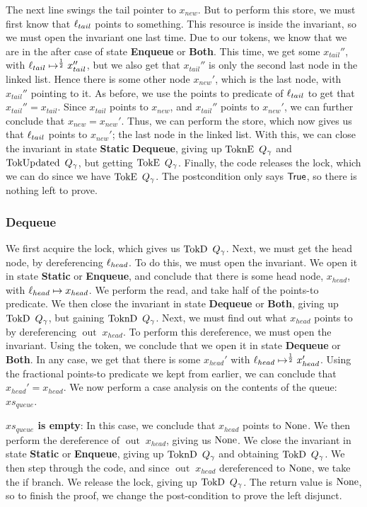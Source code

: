 \documentclass[twoside,11pt,openright]{report}
\newcommand{\nOut}[1]{\operatorname{out} \; #1}
\newcommand{\StaticState}{\textbf{Static}}
\newcommand{\EnqueueState}{\textbf{Enqueue}}
\newcommand{\DequeueState}{\textbf{Dequeue}}
\newcommand{\BothState}{\textbf{Both}}
\newcommand{\Qg}{Q_\gname}
\newcommand{\TokE}[1]{\operatorname{TokE}\ #1}
\newcommand{\TokEQg}{\TokE{\Qg}}
\newcommand{\ToknE}[1]{\operatorname{ToknE}\ #1}
\newcommand{\ToknEQg}{\ToknE{\Qg}}
\newcommand{\TokD}[1]{\operatorname{TokD}\ #1}
\newcommand{\TokDQg}{\TokD{\Qg}}
\newcommand{\ToknD}[1]{\operatorname{ToknD}\ #1}
\newcommand{\ToknDQg}{\ToknD{\Qg}}
\newcommand{\TokUpdated}[1]{\operatorname{TokUpdated}\ #1}
\newcommand{\TokUpdatedQg}{\TokUpdated{\Qg}}
\begin{document}
The next line swings the tail pointer to $x_{new}$. But to perform this store, we must first know that $\ell_{tail}$ points to something. This resource is inside the invariant, so we must open the invariant one last time. Due to our tokens, we know that we are in the after case of state \EnqueueState{} or \BothState{}. This time, we get some $x_{tail}''$, with $\ell_{tail} \mapsto^{\frac{1}{2}} x_{tail}''$, but we also get that $x_{tail}''$ is only the second last node in the linked list. Hence there is some other node $x_{new}'$, which is the last node, with $x_{tail}''$ pointing to it. As before, we use the points to predicate of $\ell_{tail}$ to get that $x_{tail}'' = x_{tail}$. Since $x_{tail}$ points to $x_{new}$, and $x_{tail}''$ points to $x_{new}'$, we can further conclude that $x_{new} = x_{new}'$. Thus, we can perform the store, which now gives us that $\ell_{tail}$ points to $x_{new}'$; the last node in the linked list. With this, we can close the invariant in state \StaticState{} \DequeueState{}, giving up $\ToknEQg$ and $\TokUpdatedQg$, but getting $\TokEQg$. Finally, the code releases the lock, which we can do since we have $\TokEQg$. The postcondition only says $\textsf{True}$, so there is nothing left to prove.

\subsubsection{Dequeue}
We first acquire the lock, which gives us $\TokDQg$. Next, we must get the head node, by dereferencing $\ell_{head}$. To do this, we must open the invariant. We open it in state \StaticState{} or \EnqueueState{}, and conclude that there is some head node, $x_{head}$, with $\ell_{head} \mapsto x_{head}$. We perform the read, and take half of the points-to predicate. We then close the invariant in state \DequeueState{} or \BothState{}, giving up $\TokDQg$, but gaining $\ToknDQg$. Next, we must find out what $x_{head}$ points to by dereferencing $\nOut{x_{head}}$. To perform this dereference, we must open the invariant. Using the token, we conclude that we open it in state \DequeueState{} or \BothState{}. In any case, we get that there is some $x_{head}'$ with $\ell_{head} \mapsto^{\frac{1}{2}} x_{head}'$. Using the fractional points-to predicate we kept from earlier, we can conclude that $x_{head}' = x_{head}$. We now perform a case analysis on the contents of the queue: $xs_{queue}$.

\textbf{$xs_{queue}$ is empty}: In this case, we conclude that $x_{head}$ points to $\operatorname{None}$. We then perform the dereference of $\nOut{x_{head}}$, giving us $\operatorname{None}$. We close the invariant in state \StaticState{} or \EnqueueState{}, giving up $\ToknDQg$ and obtaining $\TokDQg$. We then step through the code, and since $\nOut{x_{head}}$ dereferenced to $\operatorname{None}$, we take the if branch. We release the lock, giving up $\TokDQg$. The return value is $\operatorname{None}$, so to finish the proof, we change the post-condition to prove the left disjunct.
\end{document}
